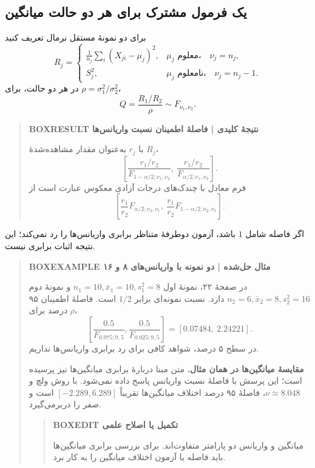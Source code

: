 \subsection{یک فرمول مشترک برای هر دو حالت میانگین}
برای دو نمونهٔ مستقل نرمال تعریف کنید
\[
R_j=\begin{cases}
\displaystyle\frac1{n_j}\sum_i(X_{ji}-\mu_j)^2,&\mu_j\text{ معلوم،}\quad\nu_j=n_j,\\[4pt]
S_j^2,&\mu_j\text{ نامعلوم،}\quad\nu_j=n_j-1.
\end{cases}
\]
در هر دو حالت، برای $\rho=\sigma_1^2/\sigma_2^2$،
\[Q=\frac{R_1/R_2}{\rho}\sim F_{\nu_1,\nu_2}.\]
\begin{quote}\textbf{BOXRESULT نتیجهٔ کلیدی | فاصلهٔ اطمینان نسبت واریانس‌ها}\par 
با $r_j$ به‌عنوان مقدار مشاهده‌شدهٔ $R_j$،
\[
\boxed{\left[\frac{r_1/r_2}{F_{1-\alpha/2;\nu_1,\nu_2}},\
\frac{r_1/r_2}{F_{\alpha/2;\nu_1,\nu_2}}\right].}
\]
فرم معادل با چندک‌های درجات آزادی معکوس عبارت است از
\[
\left[\frac{r_1}{r_2}F_{\alpha/2;\nu_2,\nu_1},\
\frac{r_1}{r_2}F_{1-\alpha/2;\nu_2,\nu_1}\right].
\]
\end{quote}
اگر فاصله شامل $1$ باشد، آزمون دوطرفهٔ متناظر برابری واریانس‌ها را رد نمی‌کند؛ این نتیجه اثبات برابری نیست.
\begin{quote}\textbf{BOXEXAMPLE مثال حل‌شده | دو نمونه با واریانس‌های ۸ و ۱۶}\par 
در صفحهٔ ۲۲، نمونهٔ اول $n_1=10,\bar x_1=10,s_1^2=8$ و نمونهٔ دوم $n_2=6,\bar x_2=8,s_2^2=16$ دارد. نسبت نمونه‌ای برابر $1/2$ است. فاصلهٔ اطمینان ۹۵ درصد برای $\rho$،
\[
\left[\frac{0.5}{F_{0.975;9,5}},\frac{0.5}{F_{0.025;9,5}}\right]
=\boxed{[0.07484,\ 2.24221]}.
\]
در سطح ۵ درصد، شواهد کافی برای رد برابری واریانس‌ها نداریم.

\textbf{مقایسهٔ میانگین‌ها در همان مثال.} متن مبنا دربارهٔ برابری میانگین‌ها نیز پرسیده است؛ این پرسش با فاصلهٔ نسبت واریانس پاسخ داده نمی‌شود. با روش ولچ و $\nu\approx8.048$، فاصلهٔ ۹۵ درصد اختلاف میانگین‌ها تقریباً $[-2.289,6.289]$ است و صفر را دربرمی‌گیرد.
\begin{quote}\textbf{BOXEDIT تکمیل یا اصلاح علمی}\par میانگین و واریانس دو پارامتر متفاوت‌اند. برای بررسی برابری میانگین‌ها باید فاصله یا آزمون اختلاف میانگین را به کار برد.\end{quote}
\end{quote}
